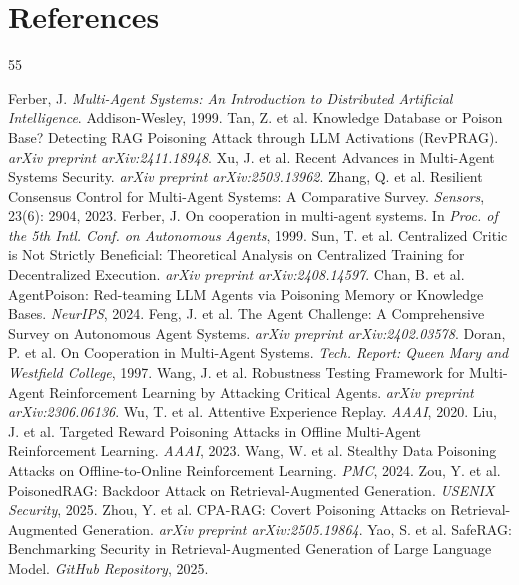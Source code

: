 \documentclass[conference]{IEEEtran}
\begin{document}

\balance
\clearpage
\section*{References}
\begin{thebibliography}{55}

 Ferber, J. \emph{Multi-Agent Systems: An Introduction to Distributed Artificial Intelligence}. Addison-Wesley, 1999.
 Tan, Z. et al. Knowledge Database or Poison Base? Detecting RAG Poisoning Attack through LLM Activations (RevPRAG). \emph{arXiv preprint arXiv:2411.18948}.
 Xu, J. et al. Recent Advances in Multi-Agent Systems Security. \emph{arXiv preprint arXiv:2503.13962}.
 Zhang, Q. et al. Resilient Consensus Control for Multi-Agent Systems: A Comparative Survey. \emph{Sensors}, 23(6): 2904, 2023.
 Ferber, J. On cooperation in multi-agent systems. In \emph{Proc. of the 5th Intl. Conf. on Autonomous Agents}, 1999.
 Sun, T. et al. Centralized Critic is Not Strictly Beneficial: Theoretical Analysis on Centralized Training for Decentralized Execution. \emph{arXiv preprint arXiv:2408.14597}.
 Chan, B. et al. AgentPoison: Red-teaming LLM Agents via Poisoning Memory or Knowledge Bases. \emph{NeurIPS}, 2024.
 Feng, J. et al. The Agent Challenge: A Comprehensive Survey on Autonomous Agent Systems. \emph{arXiv preprint arXiv:2402.03578}.
 Doran, P. et al. On Cooperation in Multi-Agent Systems. \emph{Tech. Report: Queen Mary and Westfield College}, 1997.
 Wang, J. et al. Robustness Testing Framework for Multi-Agent Reinforcement Learning by Attacking Critical Agents. \emph{arXiv preprint arXiv:2306.06136}.
 Wu, T. et al. Attentive Experience Replay. \emph{AAAI}, 2020.
 Liu, J. et al. Targeted Reward Poisoning Attacks in Offline Multi-Agent Reinforcement Learning. \emph{AAAI}, 2023.
 Wang, W. et al. Stealthy Data Poisoning Attacks on Offline-to-Online Reinforcement Learning. \emph{PMC}, 2024.
 Zou, Y. et al. PoisonedRAG: Backdoor Attack on Retrieval-Augmented Generation. \emph{USENIX Security}, 2025.
 Zhou, Y. et al. CPA-RAG: Covert Poisoning Attacks on Retrieval-Augmented Generation. \emph{arXiv preprint arXiv:2505.19864}.
 Yao, S. et al. SafeRAG: Benchmarking Security in Retrieval-Augmented Generation of Large Language Model. \emph{GitHub Repository}, 2025.

\end{thebibliography}
\end{document}
